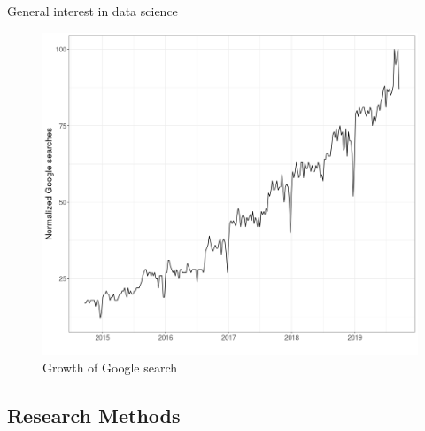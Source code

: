 \begin{frame}{General interest in data science}
    \begin{figure}
    \caption{Growth of Google search}
    \includegraphics[width = .8\framewidth]{png/ds-searches.png}

    \end{figure}
\end{frame}

\subsection{Research Methods}

